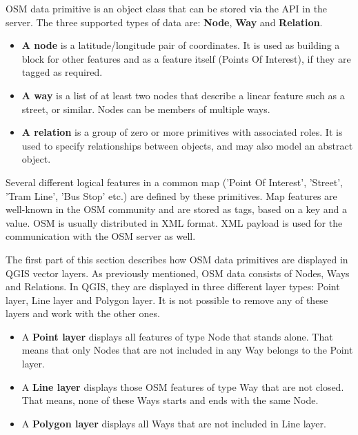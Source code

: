 OSM data primitive is an object class that can be stored via the API in the
server. The three supported types of data are: \textbf{Node}, \textbf{Way}
and \textbf{Relation}.

\begin{itemize}[label=--]
\item \textbf{A node} is a latitude/longitude pair of coordinates. It is
used as building a block for other features and as a feature itself (Points
Of Interest), if they are tagged as required.
\item \textbf{A way} is a list of at least two nodes that describe a linear
feature such as a street, or similar. Nodes can be members of multiple ways.
\item \textbf{A relation} is a group of zero or more primitives with
associated roles. It is used to specify relationships between objects,
and may also model an abstract object.
\end{itemize}

Several different logical features in a common map ('Point Of Interest',
'Street', 'Tram Line', 'Bus Stop' etc.) are defined by these primitives.
Map features are well-known in the OSM community and are stored as tags,
based on a key and a value. OSM is usually distributed in XML format. XML
payload is used for the communication with the OSM server as well.

\label{qgis-osm-connection}

The first part of this section describes how OSM data primitives
are displayed in QGIS vector layers. As previously mentioned, OSM data consists of
Nodes, Ways and Relations. In QGIS, they are displayed in three different
layer types: Point layer, Line layer and Polygon layer. It is not possible
to remove any of these layers and work with the other ones. %

\begin{itemize}[label=--]
\item A \textbf{Point layer} displays all features of type Node that stands
alone. That means that only Nodes that are not included in any Way belongs
to the Point layer.
\item A \textbf{Line layer} displays those OSM features of type Way that are
not closed. That means, none of these Ways starts and ends with the
same Node.
\item A \textbf{Polygon layer} displays all Ways that are not included in
Line layer.
\end{itemize}

